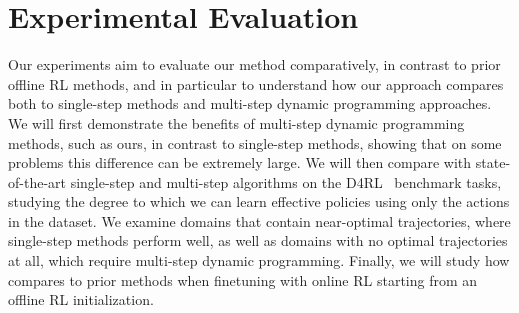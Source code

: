 
\section{Experimental Evaluation}

\vspace{-0.4cm}

Our experiments aim to evaluate our method comparatively, in contrast to prior offline RL methods, and in particular to understand how our approach compares both to single-step methods and multi-step dynamic programming approaches. We will first demonstrate the benefits of multi-step dynamic programming methods, such as ours, in contrast to single-step methods, showing that on some problems this difference can be extremely large. We will then compare \ourname with state-of-the-art single-step and multi-step algorithms on the D4RL~\citep{fu2020d4rl} benchmark tasks, studying the degree to which we can learn effective policies using only the actions in the dataset. We examine domains that contain near-optimal trajectories, where single-step methods perform well, as well as domains with no optimal trajectories at all, which require multi-step dynamic programming. Finally, we will study how \ourname compares to prior methods when finetuning with online RL starting from an offline RL initialization.


